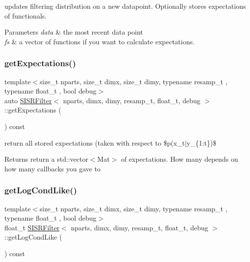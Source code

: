 updates filtering distribution on a new datapoint. Optionally stores expectations of functionals. 


\begin{DoxyParams}{Parameters}
{\em data} & the most recent data point \\
\hline
{\em fs} & a vector of functions if you want to calculate expectations. \\
\hline
\end{DoxyParams}
\mbox{\label{classSISRFilter_a9a96eff46d2c5e54402fd081b4a95fba}} 
\subsubsection{\texorpdfstring{get\+Expectations()}{getExpectations()}}
{\footnotesize\ttfamily template$<$size\+\_\+t nparts, size\+\_\+t dimx, size\+\_\+t dimy, typename resamp\+\_\+t , typename float\+\_\+t , bool debug$>$ \\
auto \hyperlink{classSISRFilter}{S\+I\+S\+R\+Filter}$<$ nparts, dimx, dimy, resamp\+\_\+t, float\+\_\+t, debug $>$\+::get\+Expectations (\begin{DoxyParamCaption}{ }\end{DoxyParamCaption}) const}



return all stored expectations (taken with respect to \$p(x\+\_\+t$\vert$y\+\_\+\{1\+:t\})\$ 

\begin{DoxyReturn}{Returns}
return a std\+::vector$<$\+Mat$>$ of expectations. How many depends on how many callbacks you gave to 
\end{DoxyReturn}
\mbox{\label{classSISRFilter_ac1e812ed67ec3ed51a09f9c4bf215d88}} 
\subsubsection{\texorpdfstring{get\+Log\+Cond\+Like()}{getLogCondLike()}}
{\footnotesize\ttfamily template$<$size\+\_\+t nparts, size\+\_\+t dimx, size\+\_\+t dimy, typename resamp\+\_\+t , typename float\+\_\+t , bool debug$>$ \\
float\+\_\+t \hyperlink{classSISRFilter}{S\+I\+S\+R\+Filter}$<$ nparts, dimx, dimy, resamp\+\_\+t, float\+\_\+t, debug $>$\+::get\+Log\+Cond\+Like (\begin{DoxyParamCaption}{ }\end{DoxyParamCaption}) const\hspace{0.3cm}{\ttfamily [virtual]}}



